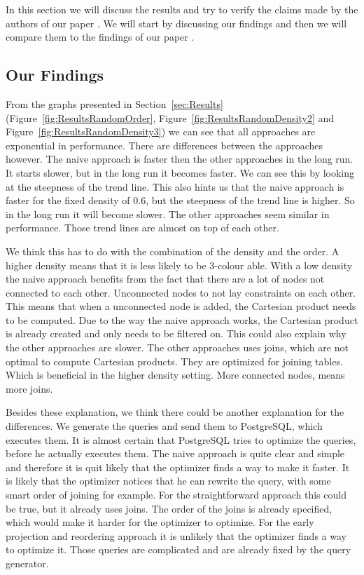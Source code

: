 In this section we will discuss the results and try to verify the claims made by the authors of our paper \cite{paper}. We will start by discussing our findings and then we will compare them to the findings of our paper \cite{paper}.

\subsection{Our Findings} \label{subsec:DissFindings}
From the graphs presented in Section~\ref{sec:Results} (Figure~\ref{fig:ResultsRandomOrder}, Figure~\ref{fig:ResultsRandomDensity2} and Figure~\ref{fig:ResultsRandomDensity3}) we can see that all approaches are exponential in performance. There are differences between the approaches however. The naive approach is faster then the other approaches in the long run. It starts slower, but in the long run it becomes faster. We can see this by looking at the steepness of the trend line. This also hints us that the naive approach is faster for the fixed density of 0.6, but the steepness of the trend line is higher. So in the long run it will become slower. The other approaches seem similar in performance. Those trend lines are almost on top of each other. 

We think this has to do with the combination of the density and the order. A higher density means that it is less likely to be 3-colour able. With a low density the naive approach benefits from the fact that there are a lot of nodes not connected to each other. Unconnected nodes to not lay constraints on each other. This means that when a unconnected node is added, the Cartesian product needs to be computed. Due to the way the naive approach works, the Cartesian product is already created and only needs to be filtered on. This could also explain why the other approaches are slower. The other approaches uses joins, which are not optimal to compute Cartesian products. They are optimized for joining tables. Which is beneficial in the higher density setting. More connected nodes, means more joins. 

Besides these explanation, we think there could be another explanation for the differences. We generate the queries and send them to PostgreSQL, which executes them. It is almost certain that PostgreSQL tries to optimize the queries, before he actually executes them. The naive approach is quite clear and simple and therefore it is quit likely that the optimizer finds a way to make it faster. It is likely that the optimizer notices that he can rewrite the query, with some smart order of joining for example. For the straightforward approach this could be true, but it already uses joins. The order of the joins is already specified, which would make it harder for the optimizer to optimize. For the early projection and reordering approach it is unlikely that the optimizer finds a way to optimize it. Those queries are complicated and are already fixed by the query generator. 

